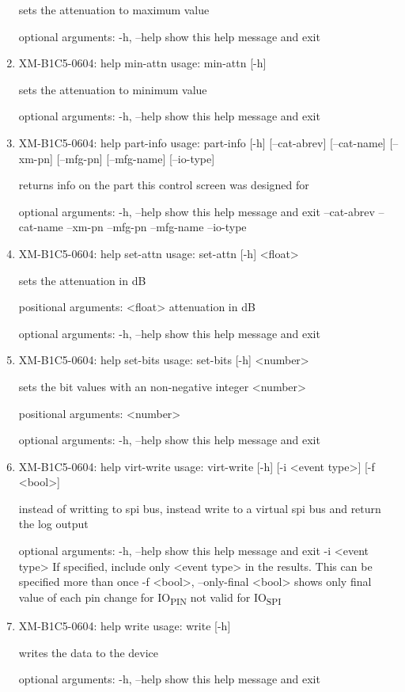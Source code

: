 \documentclass[11pt]{article}
\begin{document}
\begin{enumerate}
sets the attenuation to maximum value

optional arguments:
  -h, --help  show this help message and exit

\item XM-B1C5-0604: help min-attn
\label{sec:org6e04d2e}
usage: min-attn [-h]

sets the attenuation to minimum value

optional arguments:
  -h, --help  show this help message and exit

\item XM-B1C5-0604: help part-info
\label{sec:orgf792caa}
usage: part-info  [-h] [--cat-abrev] [--cat-name] [--xm-pn] [--mfg-pn] [--mfg-name]
        [--io-type]

returns info on the part this control screen was designed for

optional arguments:
  -h, --help   show this help message and exit
  --cat-abrev
  --cat-name
  --xm-pn
  --mfg-pn
  --mfg-name
  --io-type

\item XM-B1C5-0604: help set-attn
\label{sec:orgdd117f5}
usage: set-attn [-h] <float>

sets the attenuation in dB

positional arguments:
  <float>     attenuation in dB

optional arguments:
  -h, --help  show this help message and exit

\item XM-B1C5-0604: help set-bits
\label{sec:orgda14430}
usage: set-bits [-h] <number>

sets the bit values with an non-negative integer <number>

positional arguments:
  <number>

optional arguments:
  -h, --help  show this help message and exit

\item XM-B1C5-0604: help virt-write
\label{sec:orgbfe612e}
usage: virt-write [-h] [-i <event type>] [-f <bool>]

instead of writting to spi bus, instead write to a virtual spi bus and return
the log output

optional arguments:
  -h, --help            show this help message and exit
  -i <event type>       If specified, include only <event type> in the
                        results. This can be specified more than once
  -f <bool>, --only-final <bool>
                        shows only final value of each pin change for IO\textsubscript{PIN}
                        not valid for IO\textsubscript{SPI}

\item XM-B1C5-0604: help write
\label{sec:org6faa5d0}
usage: write [-h]

writes the data to the device

optional arguments:
  -h, --help  show this help message and exit
\end{enumerate}
\end{document}
